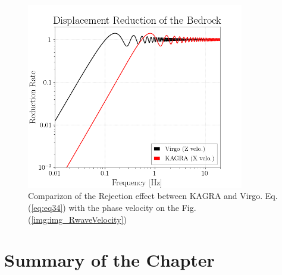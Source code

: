\documentclass[a4paper,12pt]{book}
\begin{document}
\begin{figure}[H]
  \begin{center}
    \includegraphics[width=9.5cm]{./img_CDMR.png}
  \end{center}
  \caption{Comparizon of the Rejection effect between KAGRA and Virgo. Eq.(\ref{eq:eq34}) with the phase velocity on the Fig.(\ref{img:img_RwaveVelocity})}
  \label{img:img_dmrr}
\end{figure}


\section{Summary of the Chapter}

\appendix


\end{document}
